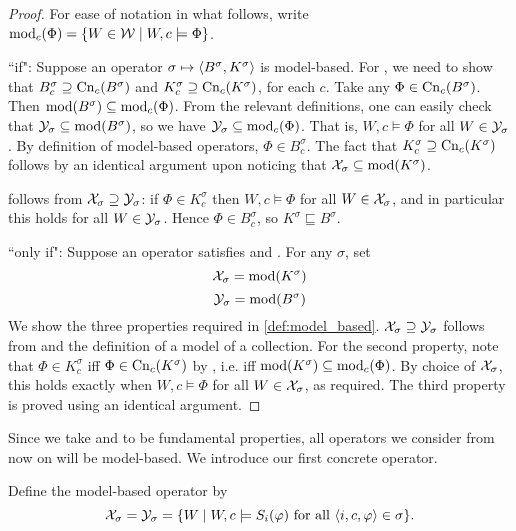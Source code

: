 \begin{proof}
    For ease of notation in what follows, write $\operatorname{mod}_c(\Phi) = \{W \in \mathcal{W}
    \mid W, c \models \Phi\}$.

``if": Suppose an operator $\sigma \mapsto \langle {B^\sigma, K^\sigma} \rangle$ is
model-based. For \closure{}, we need to show that $B^\sigma_c \supseteq
\operatorname{Cn}_c(B^\sigma)$ and $K^\sigma_c \supseteq \operatorname{Cn}_c(K^\sigma)$, for each $c$. Take
any $\Phi \in \operatorname{Cn}_c(B^\sigma)$. Then $\operatorname{mod}(B^\sigma) \subseteq \operatorname{mod}_c(\Phi)$.
From the relevant definitions, one can easily check that $\mathcal{Y}_\sigma \subseteq
\operatorname{mod}(B^\sigma)$, so we have $\mathcal{Y}_\sigma \subseteq \operatorname{mod}_c(\Phi)$. That is, $W,
c \models \Phi$ for all $W \in \mathcal{Y}_\sigma$. By definition of model-based
operators, $\Phi \in B^\sigma_c$. The fact that $K^\sigma_c \supseteq
\operatorname{Cn}_c(K^\sigma)$ follows by an identical argument upon noticing that $\mathcal{X}_\sigma
\subseteq \operatorname{mod}(K^\sigma)$.

\containment{} follows from $\mathcal{X}_\sigma \supseteq \mathcal{Y}_\sigma$: if $\Phi \in
K^\sigma_c$ then $W, c \models \Phi$ for all $W \in \mathcal{X}_\sigma$, and in
particular this holds for all $W \in \mathcal{Y}_\sigma$. Hence $\Phi \in B^\sigma_c$,
so $K^\sigma \sqsubseteq B^\sigma$.

``only if": Suppose an operator satisfies \closure{} and
\containment{}. For any $\sigma$, set
\[
    \mathcal{X}_\sigma = \operatorname{mod}(K^\sigma)
\]
\[
    \mathcal{Y}_\sigma = \operatorname{mod}(B^\sigma)
\]
We show the three properties required in \cref{def:model_based}.  $\mathcal{X}_\sigma
\supseteq \mathcal{Y}_\sigma$ follows from \containment{} and the definition of a
model of a collection. For the second property, note that $\Phi \in K^\sigma_c$
iff $\Phi \in \operatorname{Cn}_c(K^\sigma)$ by \closure{}, i.e. iff $\operatorname{mod}(K^\sigma)
\subseteq \operatorname{mod}_c(\Phi)$.  By choice of $\mathcal{X}_\sigma$, this holds exactly when
$W, c \models \Phi$ for all $W \in \mathcal{X}_\sigma$, as required. The third property
is proved using an identical argument.
\end{proof}

Since we take \closure{} and \containment{} to be fundamental properties, all
operators we consider from now on will be model-based.
%
We introduce our first concrete operator.

\begin{definition}
    \label{def:weakop}
    Define the model-based operator \weakop{} by
    \[
        \mathcal{X}_\sigma = \mathcal{Y}_\sigma = \{
            W \mid W, c \models S_i(\varphi) \text{ for all } \langle {i, c, \varphi} \rangle
            \in \sigma
        \}.
    \]
\end{definition}

